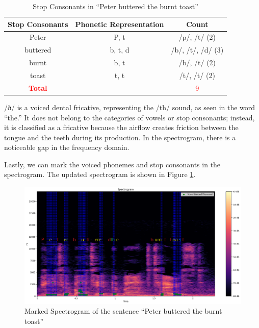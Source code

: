 \vspace{1em} %
\begin{table}[H]
    \centering
    \begin{tabular}{|c|c|c|}
        \hline
        \textbf{Stop Consonants} & \textbf{Phonetic Representation} & \textbf{Count} \\ \hline
        Peter  & P, t & /p/, /t/ (2) \\ \hline
        buttered & b, t, d & /b/, /t/, /d/ (3) \\ \hline
        burnt & b, t & /b/, /t/ (2) \\ \hline
        toast & t, t & /t/, /t/ (2) \\ \hline
        \textcolor{red}{\textbf{Total}} & & \textcolor{red}{9} \\ \hline
    \end{tabular}
    \caption{Stop Consonants in ``Peter buttered the burnt toast''}
\end{table}


/ð/ is a voiced dental fricative, representing the /th/ sound, as seen in the word ``the.'' It does not belong to the categories of vowels or stop consonants; instead, it is classified as a fricative because the airflow creates friction between the tongue and the teeth during its production. In the spectrogram, there is a noticeable gap in the frequency domain.

Lastly, we can mark the voiced phonemes and stop consonants in the spectrogram. The updated spectrogram is shown in Figure \ref{fig:Question1-3}.

\begin{figure}[H]
    \centering
    \includegraphics[width=\textwidth]{./img/Q1-2.png}
    \caption{Marked Spectrogram of the sentence ``Peter buttered the burnt toast''}
    \label{fig:Question1-3}
\end{figure}

